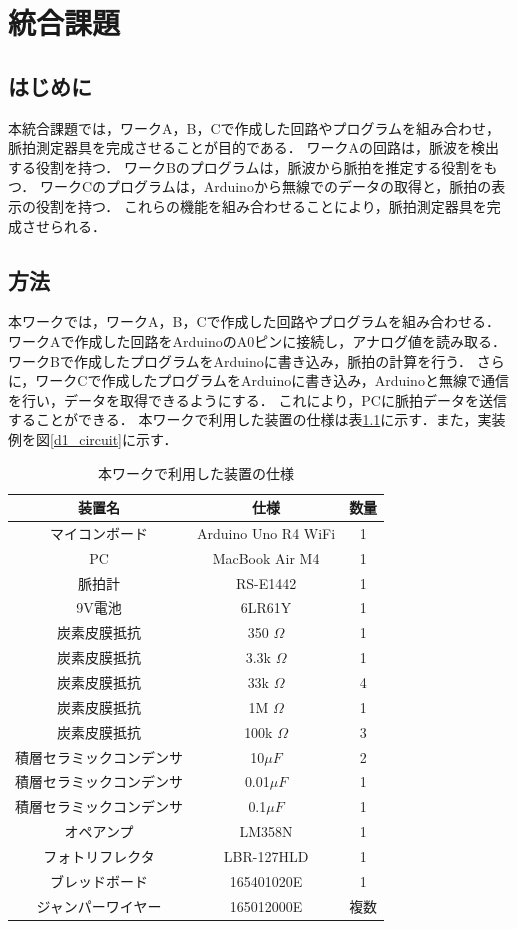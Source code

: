 \chapter{統合課題}
\section{はじめに}
本統合課題では，ワークA，B，Cで作成した回路やプログラムを組み合わせ，脈拍測定器具を完成させることが目的である．
ワークAの回路は，脈波を検出する役割を持つ．
ワークBのプログラムは，脈波から脈拍を推定する役割をもつ．
ワークCのプログラムは，Arduinoから無線でのデータの取得と，脈拍の表示の役割を持つ．
これらの機能を組み合わせることにより，脈拍測定器具を完成させられる．
\section{方法}
本ワークでは，ワークA，B，Cで作成した回路やプログラムを組み合わせる．
ワークAで作成した回路をArduinoのA0ピンに接続し，アナログ値を読み取る．
ワークBで作成したプログラムをArduinoに書き込み，脈拍の計算を行う．
さらに，ワークCで作成したプログラムをArduinoに書き込み，Arduinoと無線で通信を行い，データを取得できるようにする．
これにより，PCに脈拍データを送信することができる．
本ワークで利用した装置の仕様は表\ref{d1_tools}に示す．また，実装例を図\ref{d1_circuit}に示す．
\begin{table}[H]
    \centering
    \caption{本ワークで利用した装置の仕様}
    \label{d1_tools}
    \begin{tabular}{|c|c|c|}
        \hline
        装置名 & 仕様 &数量 \\\hline
        マイコンボード& Arduino Uno R4 WiFi &1  \\ \hline
        PC & MacBook Air M4 &1\\ \hline
        脈拍計 & RS-E1442 &1 \\ \hline
        9V電池 & 6LR61Y &1 \\ \hline
        炭素皮膜抵抗 & 350 $\Omega$ &1 \\ \hline
        炭素皮膜抵抗 & 3.3k $\Omega$ &1 \\ \hline
        炭素皮膜抵抗 & 33k $\Omega$ &4 \\ \hline
        炭素皮膜抵抗 & 1M $\Omega$ &1\\ \hline
        炭素皮膜抵抗 & 100k $\Omega$ &3 \\ \hline
        積層セラミックコンデンサ & 10$\mu F$ &2  \\ \hline
        積層セラミックコンデンサ & 0.01$\mu F$ &1  \\ \hline
        積層セラミックコンデンサ & 0.1$\mu F$ &1  \\ \hline
        オペアンプ & LM358N & 1\\ \hline
        フォトリフレクタ & LBR-127HLD &1 \\ \hline
        ブレッドボード & 165401020E &1 \\ \hline
        ジャンパーワイヤー & 165012000E &複数 \\ \hline
    \end{tabular}
\end{table}

